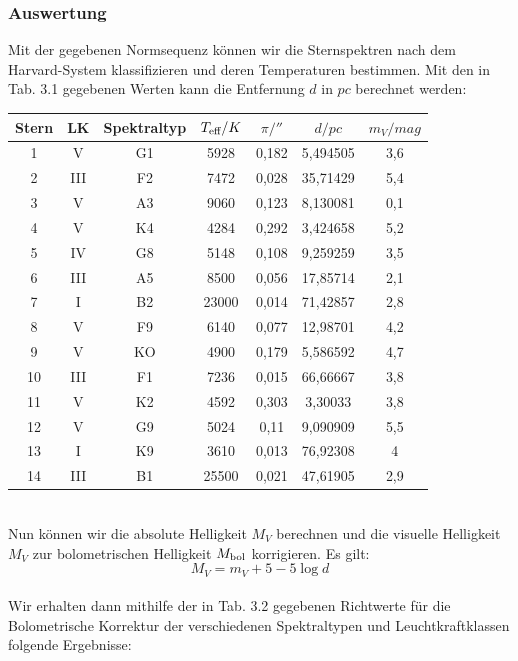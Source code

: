 \documentclass[12pt]{article}
\begin{document}
\subsubsection*{Auswertung}
Mit der gegebenen Normsequenz können wir die Sternspektren nach dem Harvard-System klassifizieren und deren Temperaturen bestimmen. Mit den in Tab. 3.1 gegebenen Werten kann die Entfernung $d$ in $pc$ berechnet werden:
\begin{table}[!ht]
    \centering
    \begin{tabular}{c|c|c|c|c|c|c}
        Stern & LK & Spektraltyp & $T_{\textnormal{eff}}/K$ & $\pi / ''$ & $d/pc$ & $m_V/mag$ \\ \hline
        1 & V & G1 & 5928 & 0,182 & 5,494505 & 3,6 \\ 
        2 & III & F2 & 7472 & 0,028 & 35,71429 & 5,4 \\ 
        3 & V & A3 & 9060 & 0,123 & 8,130081 & 0,1 \\
        4 & V & K4 & 4284 & 0,292 & 3,424658 & 5,2 \\ 
        5 & IV & G8 & 5148 & 0,108 & 9,259259 & 3,5 \\ 
        6 & III & A5 & 8500 & 0,056 & 17,85714 & 2,1 \\ 
        7 & I & B2 & 23000 & 0,014 & 71,42857 & 2,8 \\ 
        8 & V & F9 & 6140 & 0,077 & 12,98701 & 4,2 \\ 
        9 & V & KO & 4900 & 0,179 & 5,586592 & 4,7 \\ 
        10 & III & F1 & 7236 & 0,015 & 66,66667 & 3,8 \\ 
        11 & V & K2 & 4592 & 0,303 & 3,30033 & 3,8 \\ 
        12 & V & G9 & 5024 & 0,11 & 9,090909 & 5,5 \\ 
        13 & I & K9 & 3610 & 0,013 & 76,92308 & 4 \\ 
        14 & III & B1 & 25500 & 0,021 & 47,61905 & 2,9 \\ 
    \end{tabular}
\end{table} \\
Nun können wir die absolute Helligkeit $M_V$ berechnen und die visuelle Helligkeit $M_V$ zur bolometrischen Helligkeit $M_{\textnormal{bol}}$ korrigieren. Es gilt:\\
\[M_V = m_V + 5 - 5\log d\] \\
Wir erhalten dann mithilfe der in Tab. 3.2 gegebenen Richtwerte für die Bolometrische Korrektur der verschiedenen Spektraltypen und Leuchtkraftklassen folgende Ergebnisse:\\
\end{document}
